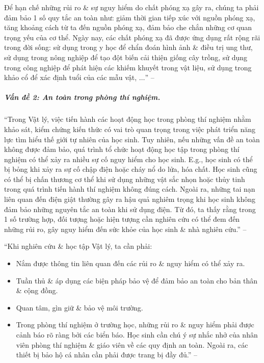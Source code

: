 \documentclass{article}
\numberwithin{equation}{section}
\begin{document}
Để hạn chế những rủi ro \& sự nguy hiểm do chất phóng xạ gây ra, chúng ta phải đảm bảo 1 số quy tắc an toàn như: giảm thời gian tiếp xúc với nguồn phóng xạ, tăng khoảng cách từ ta đến nguồn phóng xạ, đảm bảo che chắn những cơ quan trọng yếu của cơ thể. Ngày nay, các chất phóng xạ đã được ứng dụng rất rộng rãi trong đời sống: sử dụng trong y học để chẩn đoán hình ảnh \& điều trị ung thư, sử dụng trong nông nghiệp để tạo đột biến cải thiện giống cây trồng, sử dụng trong công nghiệp để phát hiện các khiếm khuyết trong vật liệu, sử dụng trong khảo cổ để xác định tuổi của các mẫu vật, $\ldots$'' -- \cite[pp. 12--13]{SGK_Vat_Ly_10_Chan_Troi_Sang_Tao}

\subparagraph{Vấn đề 2: \textit{An toàn trong phòng thí nghiệm}.} ``Trong Vật lý, việc tiến hành các hoạt động học trong phòng thí nghiệm nhằm khảo sát, kiểm chứng kiến thức có vai trò quan trọng trong việc phát triển năng lực tìm hiểu thế giới tự nhiên của học sinh. Tuy nhiên, nếu những vấn đề an toàn không được đảm bảo, quá trình tổ chức hoạt động học tập trong phòng thí nghiệm có thể xảy ra nhiều sự cố nguy hiểm cho học sinh. E.g., học sinh có thể bị bỏng khi xảy ra sự cố chập điện hoặc cháy nổ do lửa, hóa chất. Học sinh cũng có thể bị chấn thương cơ thể khi sử dụng những vật sắc nhọn hoặc thủy tinh trong quá trình tiến hành thí nghiệm không đúng cách. Ngoài ra, những tai nạn liên quan đến điện giật thường gây ra hậu quả nghiêm trọng khi học sinh không đảm bảo những nguyên tắc an toàn khi sử dụng điện. Từ đó, ta thấy rằng trong 1 số trường hợp, đối tượng hoặc hiện tượng cần nghiên cứu có thể đem đến những rủi ro, gây nguy hiểm đến sức khỏe của học sinh \& nhà nghiên cứu.'' -- \cite[pp. 13--14]{SGK_Vat_Ly_10_Chan_Troi_Sang_Tao}

``Khi nghiên cứu \& học tập Vật lý, ta cần phải:
\begin{itemize}
	\item Nắm được thông tin liên quan đến các rủi ro \& nguy hiểm có thể xảy ra.
	\item Tuần thủ \& áp dụng các biện pháp bảo vệ để đảm bảo an toàn cho bản thân \& cộng đồng.
	\item Quan tâm, gìn giữ \& bảo vệ môi trường.
	\item Trong phòng thí nghiệm ở trường học, những rủi ro \& nguy hiểm phải được cảnh báo rõ ràng bởi các biển báo. Học sinh cần chú ý sự nhắc nhở của nhân viên phòng thí nghiệm \& giáo viên về các quy định an toàn. Ngoài ra, các thiết bị bảo hộ cá nhân cần phải được trang bị đầy đủ.'' -- \cite[p. 14]{SGK_Vat_Ly_10_Chan_Troi_Sang_Tao}
\end{itemize}
\end{document}
